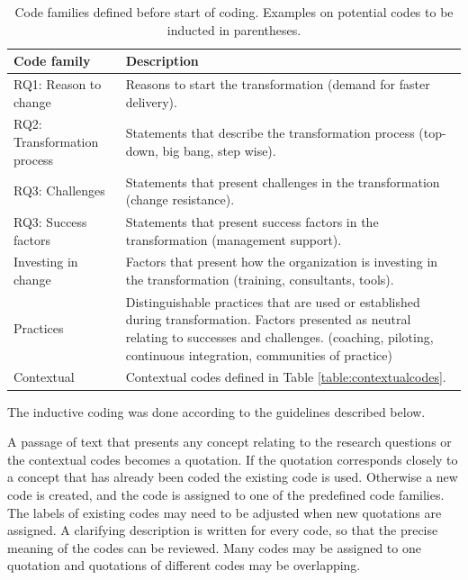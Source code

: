 \begin{table}[t]
    \centering
    \begin{tabular}{ >{\raggedright\arraybackslash}p{}
                     >{\raggedright\arraybackslash}p{} }
        \toprule
        Code family          &  Description
        \\
        \midrule

        RQ1: Reason to change &
        Reasons to start the transformation (demand for faster delivery). \\

		RQ2: Transformation process &
		Statements that describe the transformation process (top-down, big bang,
		step wise). \\

		RQ3: Challenges &
		Statements that present challenges in the transformation (change resistance).
		\\

		RQ3: Success factors &
		Statements that present success factors in the transformation (management
		support).
		\\

		Investing in change  &
		Factors that present how the organization is investing in the
		transformation (training, consultants, tools). \\

		Practices &
		Distinguishable practices that are used or established during transformation.
		Factors presented as neutral relating to successes and challenges.
		(coaching, piloting, continuous integration, communities of practice) \\
		
		Contextual &
		Contextual codes defined in Table \ref{table:contextualcodes}. \\
		
        \bottomrule
    \end{tabular}
    \caption{Code families defined before start of coding. Examples on
    potential codes to be inducted in parentheses.}
    \label{table:codefamilies}
\end{table}

The inductive coding was done according to the guidelines described below.

A passage of text that presents any concept relating to the research questions
or the contextual codes becomes a quotation. If the quotation corresponds
closely to a concept that has already been coded the existing code is used.
Otherwise a new code is created, and the code is assigned to one of the
predefined code families. The labels of existing codes may need to be adjusted
when new quotations are assigned. A clarifying description is written for every
code, so that the precise meaning of the codes can be reviewed. Many codes may
be assigned to one quotation and quotations of different codes may be
overlapping.


